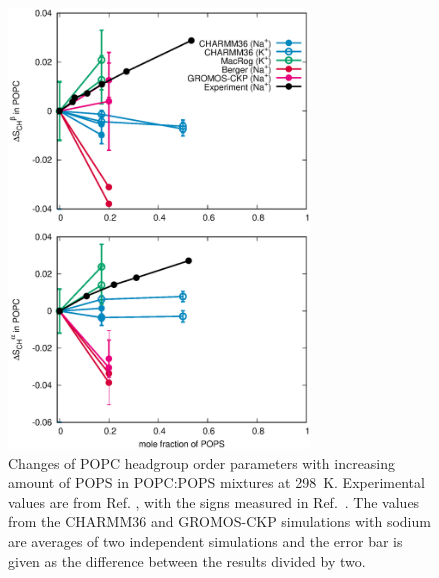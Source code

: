\documentclass[journal=jpcbfk,manuscript=article]{achemso}
\begin{document}
\begin{figure}[!tb]
  \centering
  \includegraphics[width=8.0cm]{../Figs/HGorderparametersPCvsPS.eps}
  \caption{\label{HGorderparametersPCvsPS}
    Changes of POPC headgroup order parameters with increasing amount of POPS in POPC:POPS mixtures at 298~K.
    Experimental values are from Ref. , with the signs measured in Ref.~.
    The values from the CHARMM36 and GROMOS-CKP simulations with sodium are averages of two independent simulations and
    the error bar is given as the difference between the results divided by two.
  }\end{figure}
\end{document}

